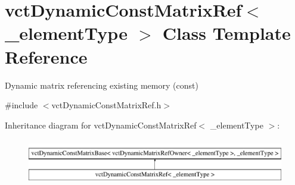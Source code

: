 \hypertarget{classvct_dynamic_const_matrix_ref}{}\section{vct\+Dynamic\+Const\+Matrix\+Ref$<$ \+\_\+element\+Type $>$ Class Template Reference}
\label{classvct_dynamic_const_matrix_ref}


Dynamic matrix referencing existing memory (const)  




{\ttfamily \#include $<$vct\+Dynamic\+Const\+Matrix\+Ref.\+h$>$}

Inheritance diagram for vct\+Dynamic\+Const\+Matrix\+Ref$<$ \+\_\+element\+Type $>$\+:\begin{figure}[H]
\begin{center}
\leavevmode
\includegraphics[height=2.000000cm]{db/da5/classvct_dynamic_const_matrix_ref}
\end{center}
\end{figure}
